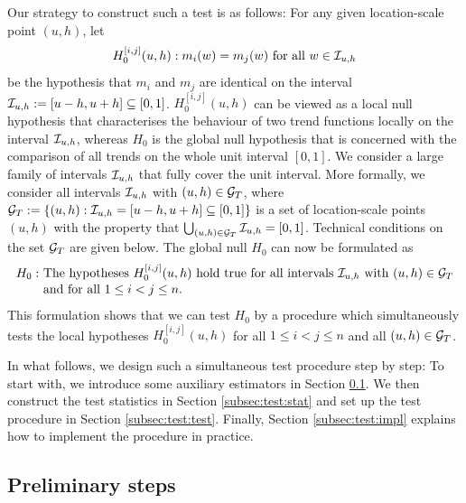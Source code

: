\documentclass[a4paper,12pt]{article}
\begin{document}
Our strategy to construct such a test is as follows: For any given location-scale point $(u,h)$, let
\[ H_0^{[i, j]}(u, h): m_i(w) = m_j(w) \text{ for all } w \in \mathcal{I}_{u, h} \] 
be the hypothesis that $m_i$ and $m_j$ are identical on the interval $\mathcal{I}_{u, h} := [u-h,u+h] \subseteq [0,1]$. $H_0^{[i, j]}(u, h)$ can be viewed as a local null hypothesis that characterises the behaviour of two trend functions locally on the interval $\mathcal{I}_{u, h}$, whereas $H_0$ is the global null hypothesis that is concerned with the comparison of all trends on the whole unit interval $[0, 1]$. We consider a large family of intervals $\mathcal{I}_{u, h}$ that fully cover the unit interval. More formally, we consider all intervals $\mathcal{I}_{u, h}$ with $(u,h) \in \mathcal{G}_T$, where $\mathcal{G}_T := \{(u, h): \mathcal{I}_{u, h} = [u-h, u+h] \subseteq [0,1]\}$ is a set of location-scale points $(u,h)$ with the property that $\bigcup_{(u, h) \in \mathcal{G}_T} \mathcal{I}_{u, h} = [0,1]$. Technical conditions on the set $\mathcal{G}_T$ are given below. The global null $H_0$ can now be formulated as 
\begin{align*}
H_0: \ & \text{The hypotheses } H_0^{[i, j]}(u, h) \text{ hold true for all intervals }  \mathcal{I}_{u, h} \text{ with } (u, h) \in \mathcal{G}_T \\[-0.075cm] & \text{and for all } 1 \le i < j \le n. 
\end{align*} 
This formulation shows that we can test $H_0$ by a procedure which simultaneously tests the local hypotheses $H_0^{[i, j]}(u, h)$ for all $1 \le i < j \le n$ and all $(u,h) \in \mathcal{G}_T$. 


In what follows, we design such a simultaneous test procedure step by step: To start with, we introduce some auxiliary estimators in Section \ref{subsec:test:prep}. We then construct the test statistics in Section \ref{subsec:test:stat} and set up the test procedure in Section \ref{subsec:test:test}. 
Finally, Section \ref{subsec:test:impl} explains how to implement the procedure in practice. 


\subsection{Preliminary steps}\label{subsec:test:prep}
\end{document}
